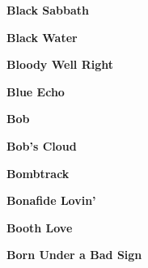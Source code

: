 \newline
\vspace{10pt} 
\begin{center}\textbf{Black Sabbath}\end{center}
\newline
\vspace{10pt} 
\begin{center}\textbf{Black Water}\end{center}
\newline
\vspace{10pt} 
\begin{center}\textbf{Bloody Well Right}\end{center}
\newline
\vspace{10pt} 
\begin{center}\textbf{Blue Echo}\end{center}
\newline
\vspace{10pt} 
\begin{center}\textbf{Bob}\end{center}
\newline
\vspace{10pt} 
\begin{center}\textbf{Bob's Cloud}\end{center}
\newline
\vspace{10pt} 
\begin{center}\textbf{Bombtrack}\end{center}
\newline
\vspace{10pt} 
\begin{center}\textbf{Bonafide Lovin'}\end{center}
\newline
\vspace{10pt} 
\begin{center}\textbf{Booth Love}\end{center}
\newline
\vspace{10pt} 
\begin{center}\textbf{Born Under a Bad Sign}\end{center}
